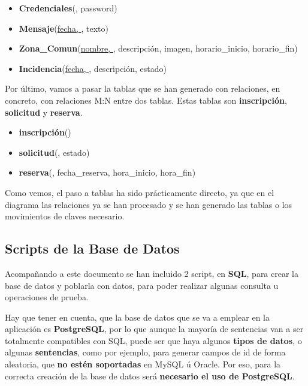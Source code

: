 \begin{itemize}
	\item \textbf{Credenciales}(\uline{}, password)
	\item \textbf{Mensaje}(\uline{fecha, }, texto)
	\item \textbf{Zona\_Comun}(\uline{nombre, }, descripción, imagen, horario\_inicio, horario\_fin)
	\item \textbf{Incidencia}(\uline{fecha, }, descripción, estado)
\end{itemize}

Por último, vamos a pasar la tablas que se han generado con relaciones, en concreto, con relaciones M:N entre dos tablas. Estas tablas son \textbf{	inscripción}, \textbf{solicitud} y \textbf{reserva}.

\begin{itemize}
	\item \textbf{inscripción}(\uline{})
	\item \textbf{solicitud}(\uline{}, estado)
	\item \textbf{reserva}(\uline{}, fecha\_reserva, hora\_inicio, hora\_fin)
\end{itemize} 

Como vemos, el paso a tablas ha sido prácticamente directo, ya que en el diagrama las relaciones ya se han procesado y se han generado las tablas o los movimientos de claves necesario.

\subsection{Scripts de la Base de Datos}
Acompañando a este documento se han incluido 2 script, en \textbf{SQL}, para crear la base de datos y poblarla con datos, para poder realizar algunas consulta u operaciones de prueba.

Hay que tener en cuenta, que la base de datos que se va a emplear en la aplicación es \textbf{PostgreSQL}, por lo que aunque la mayoría de sentencias van a ser totalmente compatibles con SQL, puede ser que haya algunos \textbf{tipos de datos}, o algunas \textbf{sentencias}, como por ejemplo, para generar campos de id de forma aleatoria, que \textbf{no estén soportadas} en MySQL ú Oracle. Por eso, para la correcta creación de la base de datos será \textbf{necesario el uso de PostgreSQL}.

